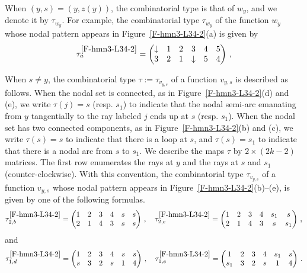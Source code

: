 \documentclass[12pt,a4paper]{amsart}
\theoremstyle{plain} %
\theoremstyle{definition}
\numberwithin{equation}{section}
\numberwithin{figure}{section}
\numberwithin{table}{section}
\begin{document}
When $(y,s) = (y,z(y))$, the combinatorial type is that of $w_y$, and we denote it by $\tau_{w_y}$. For example, the combinatorial type $\tau_{w_y}$ of the function $w_y$ whose nodal pattern appears in Figure~\ref{F-hmn3-L34-2}(a) is given by
%
\begin{equation*}
\tau_{a}^{\ref{F-hmn3-L34-2}} = \begin{pmatrix}
             \downarrow &  1 & 2 & 3 & 4 & 5 \\
               3 & 2 & 1 & \downarrow & 5 & 4 \\
             \end{pmatrix}\,,
\end{equation*}

When $s \neq y$, the combinatorial type $\tau := \tau_{v_{y,s}}$ of a function $v_{y,s}$ is described as follows. When the nodal set is connected,  as in Figure~\ref{F-hmn3-L34-2}(d) and (e), we write $\tau(j) = s$ (resp. $s_1$) to indicate that the nodal semi-arc emanating from $y$ tangentially to the ray labeled $j$ ends up at $s$ (resp. $s_1$). When the nodal set has two connected components, as in Figure~\ref{F-hmn3-L34-2}(b) and (c), we write $\tau(s)=s$ to indicate that there is a loop at $s$, and $\tau(s) = s_1$ to indicate that there is a nodal arc from $s$ to $s_1$. We describe the maps $\tau$ by $2\times (2k-2)$ matrices. The first row enumerates the rays at $y$ and the rays at $s$ and $s_1$ (counter-clockwise). With this convention, the combinatorial type $\tau_{v_{y,s}}$ of a function $v_{y,s}$ whose nodal pattern appears in Figure~\ref{F-hmn3-L34-2}(b)--(e), is given by one of the following formulas.
%
\begin{equation*}
\tau_{2,b}^{\ref{F-hmn3-L34-2}} = \begin{pmatrix}
               1 & 2 & 3 & 4 & s & s\\
               2 & 1 & 4 & 3 & s & s\\
             \end{pmatrix}\,,~~~
\tau_{2,c}^{\ref{F-hmn3-L34-2}} = \begin{pmatrix}
               1 & 2 & 3 & 4 & s_1 & s\\
               2 & 1 & 4 & 3 & s & s_1\\
             \end{pmatrix}\,,
\end{equation*}
%
and
%
\begin{equation*}
\tau_{1,d}^{\ref{F-hmn3-L34-2}} = \begin{pmatrix}
               1 & 2 & 3 & 4 & s & s\\
               s & 3 & 2 & s  & 1 & 4\\
             \end{pmatrix}\,,~~~
\tau_{1,e}^{\ref{F-hmn3-L34-2}} = \begin{pmatrix}
               1 & 2 & 3 & 4 & s_1 & s\\
               s_1 & 3  & 2 & s & 1 & 4\\
             \end{pmatrix}\,.
\end{equation*}
%
\end{document}
